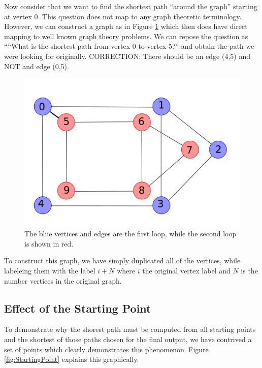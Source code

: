 \documentclass{InsightArticle}
\begin{document}
Now consider that we want to find the shortest path ``around the graph'' starting at vertex 0. This question does not map to any graph theoretic terminology. However, we can construct a graph as in Figure \ref{fig:TwoLoops2} which then does have direct mapping to well known graph theory problems. We can repose the question as ````What is the shortest path from vertex 0 to vertex 5?'' and obtain the path we were looking for originally. CORRECTION: There should be an edge (4,5) and NOT and edge (0,5).
\begin{figure}[H]
  \centering
  \includegraphics[width=0.3\linewidth]{images/TwoLoops2}
  \caption{The blue vertices and edges are the first loop, while the second loop is shown in red.}
  \label{fig:TwoLoops2}
\end{figure}

To construct this graph, we have simply duplicated all of the vertices, while labeleing them with the label $i+N$ where $i$ the original vertex label and $N$ is the number vertices in the original graph.

\subsection{Effect of the Starting Point}
\label{sec:Algorithm:StartingPoint}
To demonstrate why the shorest path must be computed from all starting points and the shortest of those paths chosen for the final output, we have contrived a set of points which clearly demonstrates this phenomenon. Figure \ref{fig:StartingPoint} explains this graphically.
\end{document}
